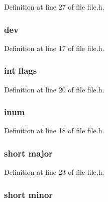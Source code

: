 Definition at line 27 of file file.\-h.

\hypertarget{structinode_aaf61a1db4c34c23857104abc633d8ee6}{
\subsubsection[{dev}]{ dev}}\label{structinode_aaf61a1db4c34c23857104abc633d8ee6}


Definition at line 17 of file file.\-h.

\hypertarget{structinode_ac8bf36fe0577cba66bccda3a6f7e80a4}{
\subsubsection[{flags}]{\setlength{\rightskip}{0pt plus 5cm}int flags}}\label{structinode_ac8bf36fe0577cba66bccda3a6f7e80a4}


Definition at line 20 of file file.\-h.

\hypertarget{structinode_a28fdf3543c2464efb0ec94a429ef8acc}{
\subsubsection[{inum}]{ inum}}\label{structinode_a28fdf3543c2464efb0ec94a429ef8acc}


Definition at line 18 of file file.\-h.

\hypertarget{structinode_abe2b53edb36f3d674f052ab7254d4a3e}{
\subsubsection[{major}]{\setlength{\rightskip}{0pt plus 5cm}short major}}\label{structinode_abe2b53edb36f3d674f052ab7254d4a3e}


Definition at line 23 of file file.\-h.

\hypertarget{structinode_adb75a8841fbdda3cb4f2373edac4f1dc}{
\subsubsection[{minor}]{\setlength{\rightskip}{0pt plus 5cm}short minor}}\label{structinode_adb75a8841fbdda3cb4f2373edac4f1dc}


